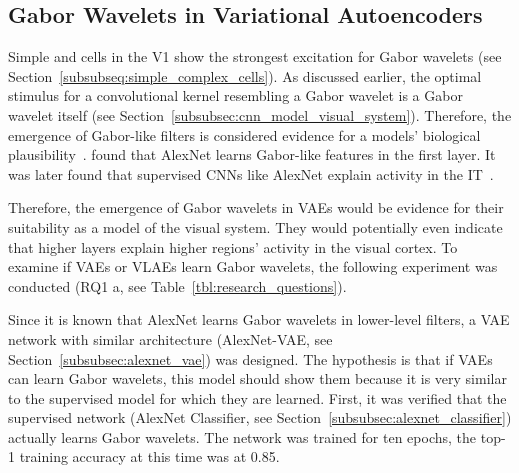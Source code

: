 \subsection{Gabor Wavelets in Variational Autoencoders}\label{subsec:results_visual_features_in_variational_autoencoders}
Simple and cells in the \ac{V1} show the strongest excitation for Gabor wavelets (see Section~\ref{subsubseq:simple_complex_cells}).
As discussed earlier, the optimal stimulus for a convolutional kernel resembling a Gabor wavelet is a Gabor wavelet itself (see Section~\ref{subsubsec:cnn_model_visual_system}).
Therefore, the emergence of Gabor-like filters is considered evidence for a models' biological plausibility~\citep{berkes2005slow}.
\citet{krizhevsky2012imagenet} found that AlexNet learns Gabor-like features in the first layer.
It was later found that supervised \acp{CNN} like AlexNet explain activity in the \ac{IT}~\citep{khaligh2014deep}.

Therefore, the emergence of Gabor wavelets in \acp{VAE} would be evidence for their suitability as a model of the visual system.
They would potentially even indicate that higher layers explain higher regions' activity in the visual cortex.
To examine if \acp{VAE} or \acp{VLAE} learn Gabor wavelets, the following experiment was conducted (RQ1 a, see Table~\ref{tbl:research_questions}).

Since it is known that AlexNet learns Gabor wavelets in lower-level filters, a \ac{VAE} network with similar architecture (AlexNet-\ac{VAE}, see Section~\ref{subsubsec:alexnet_vae}) was designed.
The hypothesis is that if \acp{VAE} can learn Gabor wavelets, this model should show them because it is very similar to the supervised model for which they are learned.
First, it was verified that the supervised network (AlexNet Classifier, see Section~\ref{subsubsec:alexnet_classifier}) actually learns Gabor wavelets.
The network was trained for ten epochs, the top-1 training accuracy at this time was at 0.85.

